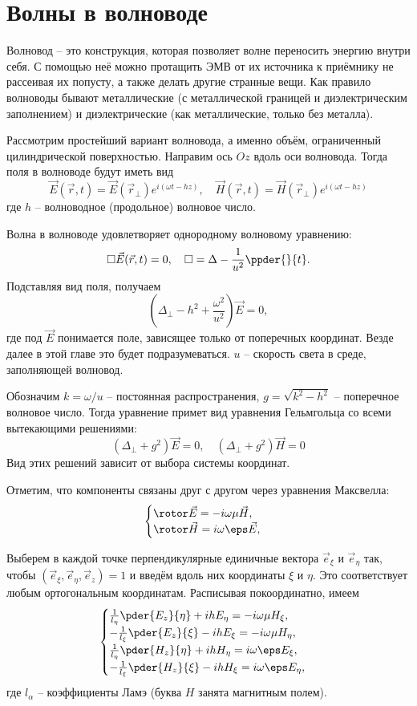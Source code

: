\chapter{Волны в волноводе}

Волновод -- это конструкция, которая позволяет волне переносить энергию внутри себя. С помощью неё можно протащить ЭМВ от их источника к приёмнику не рассеивая их попусту, а также делать другие странные вещи. Как правило волноводы бывают металлические (с металлической границей и диэлектрическим заполнением) и диэлектрические (как металлические, только без металла).

Рассмотрим простейший вариант волновода, а именно объём, ограниченный цилиндрической поверхностью. Направим ось \( Oz \) вдоль оси волновода. Тогда поля в волноводе будут иметь вид
\[
	\vec{E}(\vec{r}, t) = \vec{E}(\vec{r}_\perp)e^{i(\omega t - hz)},\quad
	\vec{H}(\vec{r}, t) = \vec{H}(\vec{r}_\perp)e^{i(\omega t - hz)}
\]
где \( h \) -- волноводное (продольное) волновое число.

Волна в волноводе удовлетворяет однородному волновому уравнению:
\[
	\square \vec{E}(\vec{r}, t) = 0,\quad \square = \Delta - \frac{1}{u^2}\ppder{}{t}.
\]
Подставляя вид поля, получаем
\[
	(\Delta_\perp - h^2 + \frac{\omega^2}{u^2}) \vec{E} = 0,
\]
где под \( \vec{E} \) понимается поле, зависящее только от поперечных координат. Везде далее в этой главе это будет подразумеваться. \( u \) -- скорость света в среде, заполняющей волновод.

Обозначим \( k = \omega / u \) -- постоянная распространения, \( g = \sqrt{k^2 - h^2} \) -- поперечное волновое число. Тогда уравнение примет вид уравнения Гельмгольца со всеми вытекающими решениями:
\[
	(\Delta_\perp + g^2) \vec{E} = 0, \quad (\Delta_\perp + g^2) \vec{H} = 0
\]
Вид этих решений зависит от выбора системы координат.

Отметим, что компоненты связаны друг с другом через уравнения Максвелла:
\[
	\begin{cases}
		\rotor\vec{E} = -i\omega\mu\vec{H},\\
		\rotor\vec{H} = i\omega\eps\vec{E},
	\end{cases}
\]

Выберем в каждой точке перпендикулярные единичные вектора \( \vec{e}_\xi \) и \( \vec{e}_\eta \) так, чтобы \( (\vec{e}_\xi, \vec{e}_\eta, \vec{e}_z) = 1 \) и введём вдоль них координаты \( \xi \) и \( \eta \). Это соответствует любым ортогональным координатам. Расписывая покоординатно, имеем
\[
	\begin{cases}
		\frac{1}{l_\eta}\pder{E_z}{\eta} + ih E_\eta = -i\omega\mu H_\xi,\\
		-\frac{1}{l_\xi}\pder{E_z}{\xi} - ih E_\xi = -i\omega\mu H_\eta,\\
		\frac{1}{l_\eta}\pder{H_z}{\eta} + ihH_\eta = i\omega\eps E_\xi,\\
		-\frac{1}{l_\xi}\pder{H_z}{\xi} - ihH_\xi = i\omega\eps E_\eta,\\
	\end{cases}
\]
где \( l_\alpha \) -- коэффициенты Ламэ (буква \( H \) занята магнитным полем).

